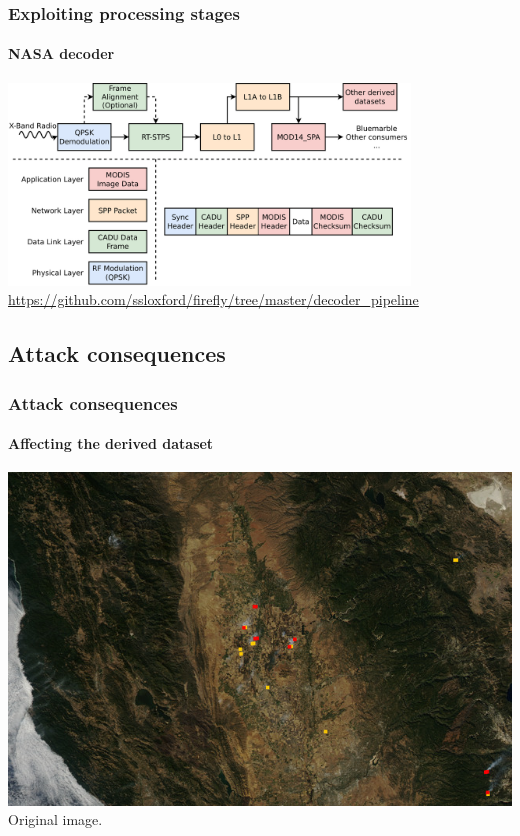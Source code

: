 \documentclass{beamer}
\begin{document}
\begin{frame}
  \frametitle{Exploiting processing stages}
  \framesubtitle{NASA decoder}
  \centering
  \includegraphics[width=0.8\textwidth]{images/attack_types.pdf}
  \url{https://github.com/ssloxford/firefly/tree/master/decoder_pipeline}
\end{frame}

\subsection{Attack consequences}

\begin{frame}
  \frametitle{Attack consequences}
  \framesubtitle{Affecting the derived dataset}
  \includegraphics[width=\textwidth]{images/injection/original.jpg}
  \newline
  \centering
  Original image.
\end{frame}
\end{document}
